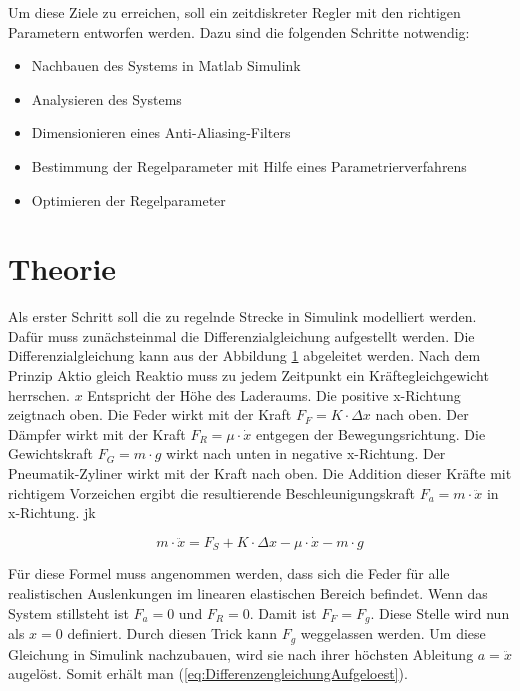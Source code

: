 	Um diese Ziele zu erreichen, soll ein zeitdiskreter Regler mit den
	richtigen Parametern entworfen werden. Dazu sind die
	folgenden Schritte notwendig:



	\begin{itemize}
		\item Nachbauen des Systems in Matlab Simulink
		\item Analysieren des Systems
		\item Dimensionieren eines Anti-Aliasing-Filters
		\item Bestimmung der Regelparameter mit Hilfe eines Parametrierverfahrens
		\item Optimieren der Regelparameter
	\end{itemize}
		
	\section{Theorie}
	Als erster Schritt soll die zu regelnde Strecke in Simulink modelliert werden. Dafür muss zunächsteinmal die Differenzialgleichung aufgestellt werden.
	Die Differenzialgleichung kann aus der Abbildung \ref{} abgeleitet werden. Nach dem Prinzip Aktio gleich Reaktio muss zu jedem Zeitpunkt ein Kräftegleichgewicht herrschen.
	$x$ Entspricht der Höhe des Laderaums. Die positive x-Richtung zeigtnach oben. Die Feder wirkt mit der Kraft $F_{F} = K \cdot \Delta x$ nach oben. Der Dämpfer wirkt mit der Kraft 
	$F_{R} = \mu \cdot \dot{x}$ entgegen der Bewegungsrichtung. Die Gewichtskraft $F_{G} = m \cdot g $ wirkt nach unten in negative x-Richtung. Der Pneumatik-Zyliner 
	wirkt mit der Kraft  nach oben. Die Addition dieser Kräfte mit richtigem Vorzeichen ergibt die resultierende Beschleunigungskraft $F_{a} = m \cdot \ddot{x}$
	in x-Richtung. jk

	\begin{equation}
		m \cdot \ddot{x} = F_{S} + K \cdot \Delta x - \mu \cdot \dot{x} - m \cdot g
		\label{eq:Differenzengleichung}
	\end{equation}

	Für diese Formel muss angenommen werden, dass sich die Feder für alle realistischen Auslenkungen im linearen elastischen Bereich befindet. Wenn das System stillsteht ist $F_{a} = 0$ 
	und $F_{R} = 0$. Damit ist $F_{F} = F_{g}$. Diese Stelle wird nun als $x = 0$ definiert. Durch diesen Trick kann $F_{g}$ weggelassen werden. 
	Um diese Gleichung in Simulink nachzubauen, wird sie nach ihrer höchsten Ableitung $a = \ddot{x}$ augelöst. Somit erhält man (\ref{eq:DifferenzengleichungAufgeloest}).


